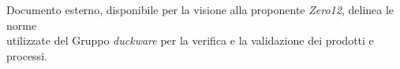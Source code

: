 Documento esterno, disponibile per la visione alla proponente \emph{Zero12}, delinea le norme\\ utilizzate del Gruppo \emph{duckware} per la verifica e la validazione dei prodotti e processi.